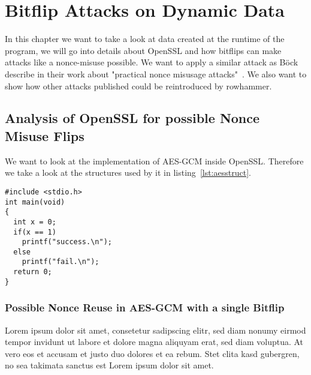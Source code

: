 \chapter{Bitflip Attacks on Dynamic Data}\label{sec:automate}

In this chapter we want to take a look at data created at the runtime of the
program, we will go into details about OpenSSL and how bitflips can make attacks
like a nonce-misuse possible. We want to apply a similar attack as Böck~\etal
describe in their work about "practical nonce misusage
attacks"~\cite{gcmnonceattack}. We also want to show how other attacks published
could be reintroduced by rowhammer.

\section{Analysis of OpenSSL for possible Nonce Misuse Flips}

We want to look at the implementation of AES-GCM inside OpenSSL. Therefore we
take a look at the structures used by it in listing~\ref{lst:aesstruct}.

\begin{minipage}{\linewidth}
\begin{lstlisting}[style=CStyle,
                   caption={Struct used by OpenSSL to describe AES.},
                   label={lst:aesstruct}]
#include <stdio.h>
int main(void)
{
  int x = 0;
  if(x == 1)
    printf("success.\n");
  else
    printf("fail.\n");
  return 0;
}
\end{lstlisting}
\end{minipage}

\subsection{Possible Nonce Reuse in AES-GCM with a single Bitflip}

Lorem ipsum dolor sit amet, consetetur sadipscing elitr, sed diam nonumy eirmod
tempor invidunt ut labore et dolore magna aliquyam erat, sed diam voluptua. At
vero eos et accusam et justo duo dolores et ea rebum. Stet clita kasd gubergren,
no sea takimata sanctus est Lorem ipsum dolor sit amet.

